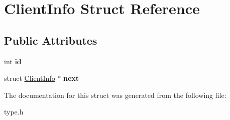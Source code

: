 \hypertarget{structClientInfo}{
\section{ClientInfo Struct Reference}
\label{structClientInfo}
}
\subsection*{Public Attributes}
\begin{DoxyCompactItemize}
\item 
\hypertarget{structClientInfo_a75e910e26c8d089be98a9533e1dc0141}{
int {\bfseries id}}
\label{structClientInfo_a75e910e26c8d089be98a9533e1dc0141}

\item 
\hypertarget{structClientInfo_a7f2d5edff8e806386dccc291cc5cf8fa}{
struct \hyperlink{structClientInfo}{ClientInfo} $\ast$ {\bfseries next}}
\label{structClientInfo_a7f2d5edff8e806386dccc291cc5cf8fa}

\end{DoxyCompactItemize}


The documentation for this struct was generated from the following file:\begin{DoxyCompactItemize}
\item 
type.h\end{DoxyCompactItemize}
